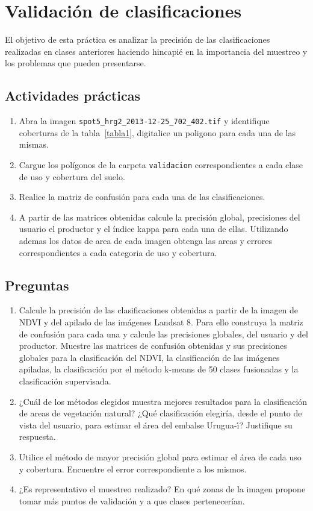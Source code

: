 \documentclass[hidelinks,12pt]{article}
\begin{document}
\newpage
\section{Validación de clasificaciones}
El objetivo de esta práctica es analizar la precisión de las clasificaciones
realizadas en clases anteriores haciendo hincapié en la importancia del muestreo
y los problemas que pueden presentarse. 

\subsection{Actividades pr\'acticas}
\begin{enumerate}
    \item Abra la imagen \texttt{spot5\_hrg2\_2013-12-25\_702\_402.tif} y
        identifique coberturas de la tabla~\ref{tabla1}, digitalice un poligono
        para cada una de las mismas.
    \item Cargue los polígonos de la carpeta \texttt{validacion} correspondientes a cada clase de
        uso y cobertura del suelo. 
    \item Realice la matriz de confusión para cada una de las clasificaciones.
    \item A partir de las matrices obtenidas calcule la precisión global,
        precisiones del usuario el productor y el índice kappa para cada una de
        ellas. Utilizando ademas los datos de area de cada imagen obtenga las
        areas y errores correspondientes a cada categoria de uso y cobertura.
\end{enumerate}
\subsection{Preguntas}
\begin{enumerate}
    \item Calcule la precisión de las clasificaciones obtenidas a partir de la
    imagen de NDVI y del apilado de las imágenes Landsat 8. Para ello
    construya la matriz de confusión para cada una y calcule  las precisiones
    globales, del usuario y del productor. Muestre las matrices de confusión
    obtenidas y sus precisiones globales para la clasificación del NDVI, la
    clasificación de las imágenes apiladas, la clasificación por el método
    k-means de 50 clases fusionadas y la clasificación supervisada.
    \item ¿Cuál de los métodos elegidos muestra mejores resultados para la
    clasificación de areas de vegetaci\'on natural? ¿Qué clasificaci\'on elegiría, desde
    el punto de vista del usuario, para estimar el área del embalse
    Urugua-\'{\i}? Justifique su respuesta.
    \item Utilice el método de mayor precisión global para estimar el área  de cada
    uso y cobertura. Encuentre el error correspondiente a los mismos.
    \item ¿Es representativo el muestreo realizado? En qué zonas de la imagen
    propone tomar más puntos de validación y a que clases pertenecerían.
\end{enumerate}
\end{document}
